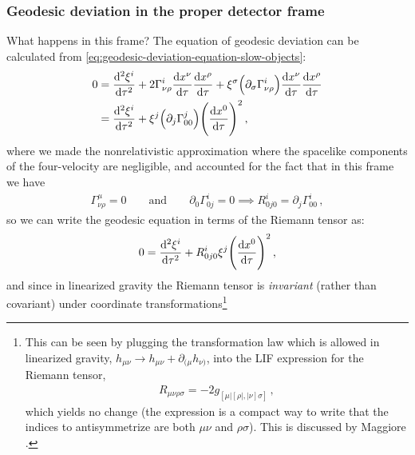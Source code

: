 \documentclass[main.tex]{subfiles}
\begin{document}
\subsubsection{Geodesic deviation in the proper detector frame}



What happens in this frame? The equation of geodesic deviation can be calculated from \eqref{eq:geodesic-deviation-equation-slow-objects}:
%
\begin{subequations}
\begin{align}
0 &= \dv[2]{\xi^{i}}{\tau}
+ 2 \Gamma^{i}_{\nu \rho } \dv{x^{\nu }}{\tau } \dv{x^{\rho }}{\tau }
+ \xi^{\sigma } \qty( \partial_{\sigma } \Gamma^{i}_{\nu \rho } ) \dv{x^{\nu }}{\tau } \dv{x^{\rho }}{\tau }  \\
&=\dv[2]{\xi^{i}}{\tau}
+ \xi^{j} \qty(\partial_{j} \Gamma^{j}_{00}) \qty(\dv{x^{0}}{\tau })^2
\,,
\end{align}
\end{subequations}
%
where we made the nonrelativistic approximation where the spacelike components of the four-velocity are negligible, and accounted for the fact that in this frame we have  
%
\begin{align}
\Gamma^{\mu }_{\nu \rho } = 0
\qquad \text{and} \qquad
\partial_0 \Gamma^{i}_{0j} =0 
\implies 
R^{i}_{0j0} = \partial_{j} \Gamma^{i}_{00} 
\,,
\end{align}
%
so we can write the geodesic equation in terms of the Riemann tensor as:
%
\begin{align}
0= \dv[2]{\xi^{i}}{\tau } + R^{i}_{0j0} \xi^{j} \qty(\dv{x^{0}}{\tau })^2
\,,
\end{align}
%
and since in linearized gravity the Riemann tensor is \emph{invariant} (rather than covariant) under coordinate transformations\footnote{This can be seen by plugging the transformation law which is allowed in linearized gravity, \(h_{\mu \nu } \to h_{\mu \nu } + \partial_{(\mu } h_{\nu )}\), into the LIF expression for the Riemann tensor, 
%
\begin{align}
R_{\mu \nu \rho \sigma } = -2 g_{[\mu | [\rho | , |\nu ] \sigma] }
\,,
\end{align}
%
which yields no change (the expression is a compact way to write that the indices to antisymmetrize are both \(\mu \nu \) and \(\rho \sigma \)). This is discussed by Maggiore \cite[below eq.\ 1.13]{maggioreGravitationalWavesVolume2007}.}
\end{document}
